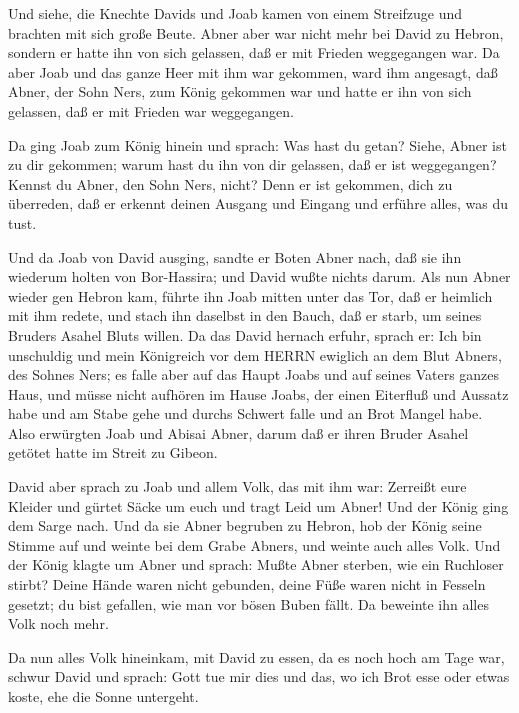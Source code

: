  Und siehe, die Knechte Davids und Joab kamen von einem
Streifzuge und brachten mit sich große Beute. Abner aber war nicht mehr
bei David zu Hebron, sondern er hatte ihn von sich gelassen, daß er mit
Frieden weggegangen war.  Da aber Joab und das ganze Heer
mit ihm war gekommen, ward ihm angesagt, daß Abner, der Sohn Ners, zum
König gekommen war und hatte er ihn von sich gelassen, daß er mit
Frieden war weggegangen.

 Da ging Joab zum König hinein und sprach: Was hast du
getan? Siehe, Abner ist zu dir gekommen; warum hast du ihn von dir
gelassen, daß er ist weggegangen?  Kennst du Abner, den
Sohn Ners, nicht? Denn er ist gekommen, dich zu überreden, daß er
erkennt deinen Ausgang und Eingang und erführe alles, was du tust.

 Und da Joab von David ausging, sandte er Boten Abner nach,
daß sie ihn wiederum holten von Bor-Hassira; und David wußte nichts
darum.  Als nun Abner wieder gen Hebron kam, führte ihn
Joab mitten unter das Tor, daß er heimlich mit ihm redete, und stach ihn
daselbst in den Bauch, daß er starb, um seines Bruders Asahel Bluts
willen.  Da das David hernach erfuhr, sprach er: Ich bin
unschuldig und mein Königreich vor dem HERRN ewiglich an dem Blut
Abners, des Sohnes Ners;  es falle aber auf das Haupt Joabs
und auf seines Vaters ganzes Haus, und müsse nicht aufhören im Hause
Joabs, der einen Eiterfluß und Aussatz habe und am Stabe gehe und durchs
Schwert falle und an Brot Mangel habe.  Also erwürgten Joab
und Abisai Abner, darum daß er ihren Bruder Asahel getötet hatte im
Streit zu Gibeon.

 David aber sprach zu Joab und allem Volk, das mit ihm war:
Zerreißt eure Kleider und gürtet Säcke um euch und tragt Leid um Abner!
Und der König ging dem Sarge nach.  Und da sie Abner
begruben zu Hebron, hob der König seine Stimme auf und weinte bei dem
Grabe Abners, und weinte auch alles Volk.  Und der König
klagte um Abner und sprach: Mußte Abner sterben, wie ein Ruchloser
stirbt?  Deine Hände waren nicht gebunden, deine Füße waren
nicht in Fesseln gesetzt; du bist gefallen, wie man vor bösen Buben
fällt. Da beweinte ihn alles Volk noch mehr.

 Da nun alles Volk hineinkam, mit David zu essen, da es
noch hoch am Tage war, schwur David und sprach: Gott tue mir dies und
das, wo ich Brot esse oder etwas koste, ehe die Sonne untergeht.

